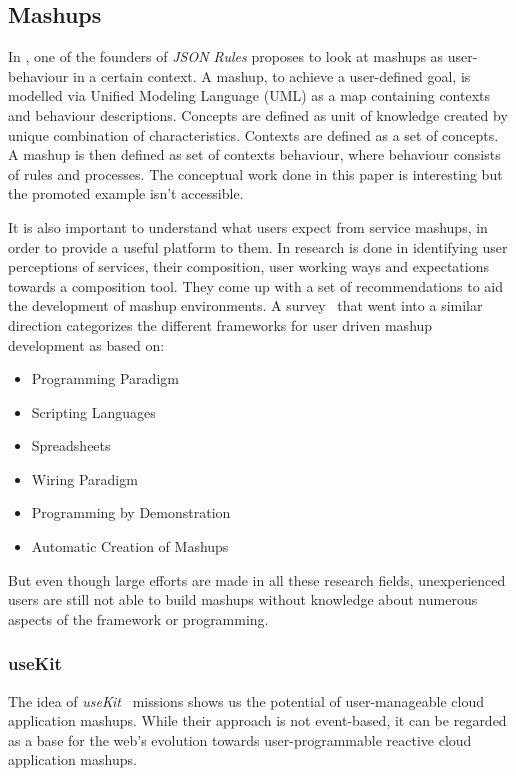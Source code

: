 \documentclass[11pt]{article}%
\begin{document}
\subsection{Mashups}
In \cite{2011-Pascalau-MBC.pdf}, one of the founders of \emph{JSON Rules} proposes to look at mashups as user-behaviour in a certain context. A mashup, to achieve a user-defined goal, is modelled via Unified Modeling Language (UML) as a map containing contexts and behaviour descriptions. Concepts are defined as unit of knowledge created by unique combination of characteristics. Contexts are defined as a set of concepts. A mashup is then defined as  set of contexts behaviour, where behaviour consists of rules and processes. The conceptual work done in this paper is interesting but the promoted example isn't accessible.

It is also important to understand what users expect from service mashups, in order to provide a useful platform to them. In \cite{2010-Namoun_etal-EURCW.pdf} research is done in identifying user perceptions of services, their composition, user working ways and expectations towards a composition tool. They come up with a set of recommendations to aid the development of mashup environments. A survey~\cite{2009-Fischer_etal-OCAMG.pdf} that went into a similar direction categorizes the different frameworks for user driven mashup development as based on:
 \begin{itemize}
  \item Programming Paradigm
  \item Scripting Languages
  \item Spreadsheets
  \item Wiring Paradigm
  \item Programming by Demonstration
  \item Automatic Creation of Mashups
\end{itemize}
But even though large efforts are made in all these research fields, unexperienced users are still not able to build mashups without knowledge about numerous aspects of the framework or programming.

\subsubsection{useKit}
The idea of \emph{useKit}~\cite{2010-Rizzotti_Burkhart-useKit.pdf} missions shows us the potential of user-manageable cloud application mashups. While their approach is not event-based, it can be regarded as a base for the web's evolution towards user-programmable reactive cloud application mashups.
\end{document}
